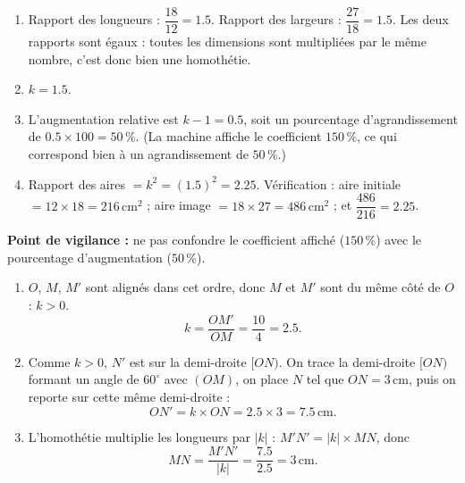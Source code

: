 \documentclass[11pt]{article}
\begin{document}
\begin{corrige}
\begin{enumerate}
\item Rapport des longueurs : $\dfrac{18}{12} = \num{1,5}$. Rapport des largeurs : $\dfrac{27}{18} = \num{1,5}$. Les deux rapports sont égaux : toutes les dimensions sont multipliées par le même nombre, c'est donc bien une homothétie.
\item $k = \num{1,5}$.
\item L'augmentation relative est $k - 1 = \num{0,5}$, soit un pourcentage d'agrandissement de $\num{0,5} \times 100 = 50\,\%$. (La machine affiche le coefficient $150\,\%$, ce qui correspond bien à un agrandissement de $50\,\%$.)
\item Rapport des aires $= k^2 = (\num{1,5})^2 = \num{2,25}$. Vérification : aire initiale $= 12 \times 18 = 216\,\text{cm}^2$ ; aire image $= 18 \times 27 = 486\,\text{cm}^2$ ; et $\dfrac{486}{216} = \num{2,25}$.
\end{enumerate}
\textbf{Point de vigilance :} ne pas confondre le coefficient affiché ($150\,\%$) avec le pourcentage d'augmentation ($50\,\%$).
\end{corrige}

\begin{corrige}
\begin{enumerate}
\item $O$, $M$, $M'$ sont alignés dans cet ordre, donc $M$ et $M'$ sont du même côté de $O$ : $k > 0$.
\[k = \dfrac{OM'}{OM} = \dfrac{10}{4} = \num{2,5}.\]
\item Comme $k > 0$, $N'$ est sur la demi-droite $[ON)$. On trace la demi-droite $[ON)$ formant un angle de $60^\circ$ avec $(OM)$, on place $N$ tel que $ON = 3\,\text{cm}$, puis on reporte sur cette même demi-droite :
\[ON' = k \times ON = \num{2,5} \times 3 = \num{7,5}\,\text{cm}.\]
\item L'homothétie multiplie les longueurs par $|k|$ : $M'N' = |k| \times MN$, donc
\[MN = \dfrac{M'N'}{|k|} = \dfrac{\num{7,5}}{\num{2,5}} = 3\,\text{cm}.\]
\end{enumerate}
\end{corrige}
\end{document}
